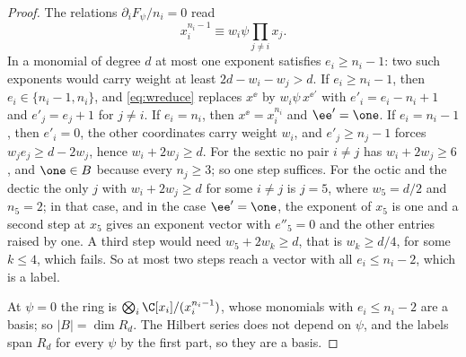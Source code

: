 \begin{proof}
The relations $\partial_iF_\psi/n_i=0$ read
\begin{equation}\label{eq:wreduce}
x_i^{n_i-1}\equiv w_i\psi\prod_{j\ne i}x_j .
\end{equation}
In a monomial of degree $d$ at most one exponent satisfies $e_i\ge n_i-1$:
two such exponents would carry weight at least $2d-w_i-w_j>d$. If
$e_i\ge n_i-1$, then $e_i\in\{n_i-1,n_i\}$, and \eqref{eq:wreduce} replaces
$x^{\ee}$ by $w_i\psi\,x^{\ee'}$ with $e'_i=e_i-n_i+1$ and $e'_j=e_j+1$ for
$j\ne i$. If $e_i=n_i$, then $x^{\ee}=x_i^{n_i}$ and $\ee'=\one$. If
$e_i=n_i-1$, then $e'_i=0$, the other coordinates carry weight $w_i$, and
$e'_j\ge n_j-1$ forces $w_je_j\ge d-2w_j$, hence $w_i+2w_j\ge d$. For the
sextic no pair $i\ne j$ has $w_i+2w_j\ge6$, and $\one\in B$ because every
$n_j\ge3$; so one step suffices. For the octic and the dectic the only $j$
with $w_i+2w_j\ge d$ for some $i\ne j$ is $j=5$, where $w_5=d/2$ and
$n_5=2$; in that case, and in the case $\ee'=\one$, the exponent of $x_5$
is one and a second step at $x_5$ gives an exponent vector with $e''_5=0$
and the other entries raised by one. A third step would need $w_5+2w_k\ge
d$, that is $w_k\ge d/4$, for some $k\le4$, which fails. So at most two
steps reach a vector with all $e_i\le n_i-2$, which is a label.

At $\psi=0$ the ring is $\bigotimes_i\C[x_i]/(x_i^{n_i-1})$, whose
monomials with $e_i\le n_i-2$ are a basis; so $|B|=\dim R_d$. The Hilbert
series does not depend on $\psi$, and the labels span $R_d$ for every
$\psi$ by the first part, so they are a basis.
\end{proof}

